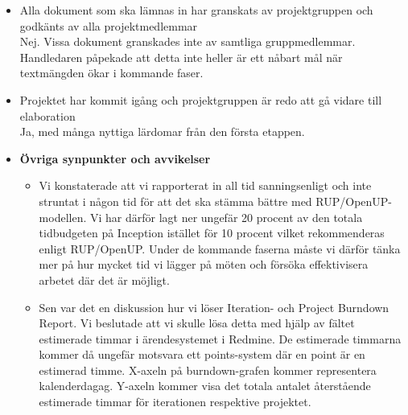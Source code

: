 \begin{itemize}
\begin{itemize}
		\item Alla dokument som ska lämnas in har granskats av projektgruppen och godkänts av alla projektmedlemmar
		\\ Nej. Vissa dokument granskades inte av samtliga gruppmedlemmar.
		Handledaren påpekade att detta inte heller är ett nåbart mål när textmängden ökar i kommande faser.

		\item Projektet har kommit igång och projektgruppen är redo att gå vidare till elaboration
		\\ Ja, med många nyttiga lärdomar från den första etappen.
	
	\item \textbf{Övriga synpunkter och avvikelser}
		\begin{itemize}
		\item Vi konstaterade att vi rapporterat in all tid sanningsenligt och inte struntat i någon tid för att det ska stämma bättre med RUP/OpenUP-modellen. Vi har därför lagt ner ungefär 20 procent av den totala tidbudgeten på Inception istället för 10 procent vilket rekommenderas enligt RUP/OpenUP. Under de kommande faserna måste vi därför tänka mer på hur mycket tid vi lägger på möten och försöka effektivisera arbetet där det är möjligt.
		\item Sen var det en diskussion hur vi löser Iteration- och Project Burndown Report. Vi beslutade att vi skulle lösa detta med hjälp av fältet estimerade timmar i ärendesystemet i Redmine. De estimerade timmarna kommer då ungefär motsvara ett points-system där en point är en estimerad timme. X-axeln på burndown-grafen kommer representera kalenderdagag. Y-axeln kommer visa det totala antalet återstående estimerade timmar för iterationen respektive projektet.
		\end{itemize}
	\end{itemize}
	
\end{itemize}



